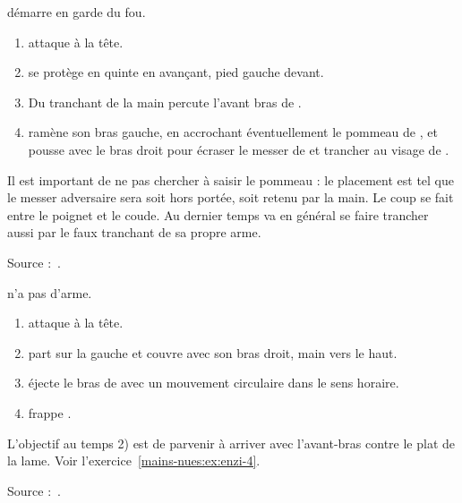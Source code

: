 \begin{technique}

\D démarre en garde du fou.

\begin{enumerate}
	\item \A attaque à la tête.
	\item \D se protège en quinte en avançant, pied gauche devant.
	\item Du tranchant de la main \D percute l'avant bras de \A.
	\item \D ramène son bras gauche, en accrochant éventuellement le pommeau de \A, et pousse avec le bras droit pour écraser le messer de \A et trancher au visage de \A.
\end{enumerate}

Il est important de ne pas chercher à saisir le pommeau : le placement est tel que le messer adversaire sera soit hors portée, soit retenu par la main. Le coup se fait entre le poignet et le coude.
Au dernier temps \A va en général se faire trancher aussi par le faux tranchant de sa propre arme.

Source :~\cite{enzi:dijon:messer_inner:2015}.

\end{technique}


\begin{technique}

\D n'a pas d'arme.

\begin{enumerate}
	\item \A attaque à la tête.
	\item \D part sur la gauche et couvre avec son bras droit, main vers le haut.
	\item \D éjecte le bras de \A avec un mouvement circulaire dans le sens horaire.
	\item \D frappe \A.
\end{enumerate}

L'objectif au temps 2) est de parvenir à arriver avec l'avant-bras contre le plat de la lame.
Voir l'exercice~\ref{mains-nues:ex:enzi-4}.

Source :~\cite{enzi:dijon:messer_inner:2015}.

\end{technique}


